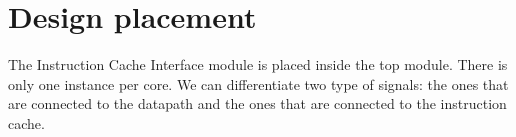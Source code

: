 \section{Design placement}
\label{chapter2}

The Instruction Cache Interface module is placed inside the top module.
There is only one instance per core.
We can differentiate two type of signals: the ones that are connected to the datapath and the ones that are connected to the instruction cache.
